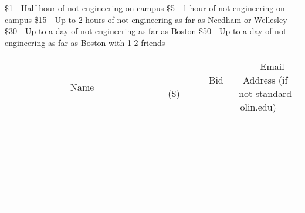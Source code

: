 \documentclass[11pt]{article}
\begin{document}
\$1 - Half hour of not-engineering on campus
\$5 - 1 hour of not-engineering on campus
\$15 - Up to 2 hours of not-engineering as far as Needham or Wellesley
\$30 - Up to a day of not-engineering as far as Boston 
\$50 - Up to a day of not-engineering as far as Boston with 1-2 friends
\\[6ex]
\begin{tabular}{c c c}
~~~~~~~~~~~~~Name~~~~~~~~~~~~~ & ~~~~~~~~~Bid (\$)~~~~~~~~~  & ~~~Email Address (if not standard olin.edu)~~~\\
 & & \\
\hline
 & & \\
\hline
 & & \\
\hline
 & & \\
\hline
 & & \\
\hline
 & & \\
\hline
 & & \\
\hline
 & & \\
\hline
 & & \\
\hline
 & & \\
\hline
 & & \\
\hline
 & & \\
\hline
 & & \\
\hline
 & & \\
\hline
 & & \\
\hline
 & & \\
\hline
 & & \\
\hline
 & & \\
\hline
 & & \\
\hline
 & & \\
\hline
 & & \\
\hline
 & & \\
\hline
 & & \\
\hline
 & & \\
\hline
 & & \\
\hline
 & & \\
\hline
\end{tabular}
\newpage
\end{document}
